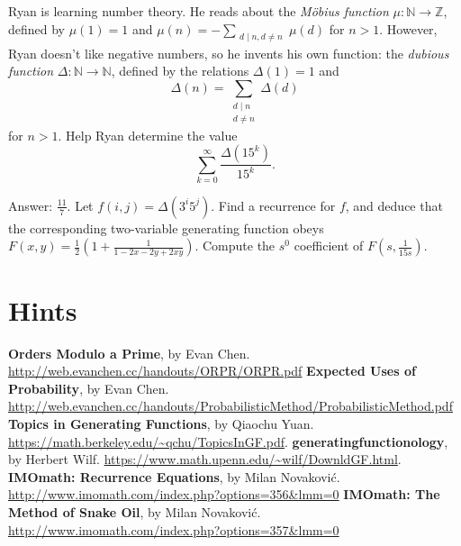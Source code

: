 \documentclass[11pt]{scrartcl}
\begin{document}
\begin{problem}
	Ryan is learning number theory.
	He reads about the \emph{M\"obius function} $\mu : \mathbb N \to \mathbb Z$,
	defined by $\mu(1)=1$ and
	$\mu(n) = -\sum_{\substack{d\mid n, d \neq n}} \mu(d)$
	for $n>1$.
	However, Ryan doesn't like negative numbers, so he invents his own function:
	the \emph{dubious function} $\Delta : \mathbb N \to \mathbb N$,
	defined by the relations $\Delta(1)=1$ and
	\[ \Delta(n) = \sum_{\substack{d\mid n \\ d \neq n}} \Delta(d) \]
	for $n > 1$.  Help Ryan determine the value 
	\[ \sum_{k=0}^{\infty} \frac{\Delta(15^k)}{15^k}.  \]
	\begin{hint}
		Answer: $\frac{11}{7}$.
		Let $f(i,j) = \Delta(3^i5^j)$.
		Find a recurrence for $f$, and deduce that the
		corresponding two-variable generating function obeys
		$F(x,y)=\frac{1}{2}\left(1+\frac{1}{1-2x-2y+2xy}\right)$.
		Compute the $s^0$ coefficient of $F(s, \frac{1}{15s})$.
	\end{hint}
\end{problem}


\section{Hints}
\makehints

\begin{thebibliography}{9}
	 \textbf{Orders Modulo a Prime},
		by Evan Chen. \url{http://web.evanchen.cc/handouts/ORPR/ORPR.pdf}
	 \textbf{Expected Uses of Probability},
		by Evan Chen. \url{http://web.evanchen.cc/handouts/ProbabilisticMethod/ProbabilisticMethod.pdf}
	 \textbf{Topics in Generating Functions},
		by Qiaochu Yuan. \url{https://math.berkeley.edu/~qchu/TopicsInGF.pdf}.
	 \textbf{generatingfunctionology},
		by Herbert Wilf. \url{https://www.math.upenn.edu/~wilf/DownldGF.html}.
	 \textbf{IMOmath: Recurrence Equations},
		by Milan Novakovi\'c. \url{http://www.imomath.com/index.php?options=356&lmm=0}
	 \textbf{IMOmath: The Method of Snake Oil},
		by Milan Novakovi\'c. \url{http://www.imomath.com/index.php?options=357&lmm=0}
\end{thebibliography}
\end{document}
